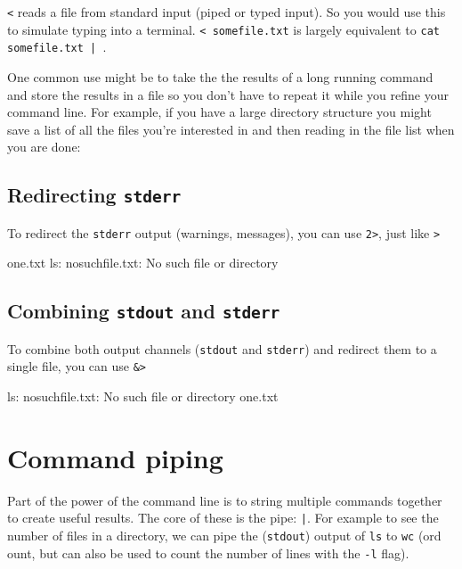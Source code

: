 \verb|<| reads a file from standard input (piped or typed input).  So you would use
this to simulate typing into a terminal. \verb|< somefile.txt| is largely equivalent to
\verb=cat somefile.txt | =.

One common use might be to take the the results of a long running command and
store the results in a file so you don't have to repeat it while you refine your
command line. For example, if you have a large directory structure you might
save a list of all the files you're interested in and then reading in the file
list when you are done:

\begin{prompt}
\end{prompt}

\subsection{Redirecting \texttt{stderr}}

To redirect the \verb|stderr| output (warnings, messages), you can use \verb|2>|, just
like \verb|>|

\begin{prompt}
one.txt
ls: nosuchfile.txt: No such file or directory
\end{prompt}

\subsection{Combining \texttt{stdout} and \texttt{stderr}}

To combine both output channels (\verb|stdout| and \verb|stderr|) and redirect them to a single file, you can use
\verb|&>|

\begin{prompt}
ls: nosuchfile.txt: No such file or directory
one.txt
\end{prompt}

\section{Command piping}

Part of the power of the command line is to string multiple commands together to
create useful results. The core of these is the pipe: \verb=|=. For example to see
the number of files in a directory, we can pipe the (\verb|stdout|) output of
\verb|ls| to \verb|wc| (ord ount, but can also be used
to count the number of lines with the \verb|-l| flag).

